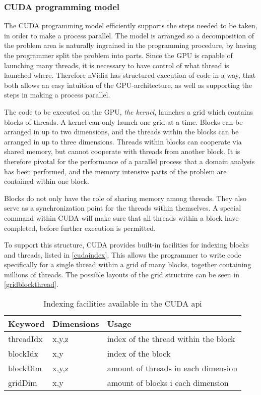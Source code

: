 \subsubsection{CUDA programming model}
The CUDA programming model efficiently supports the steps needed to be taken, in order to make a process parallel. The model is arranged so a decomposition of the problem area is naturally ingrained in the programming procedure, by having the programmer split the problem into parts. Since the GPU is capable of launching many threads, it is necessary to have control of what thread is launched where. Therefore nVidia has structured execution of code in a way, that both allows an easy intuition of the GPU-architecture, as well as supporting the steps in making a process parallel.

The code to be executed on the GPU, \emph{the kernel}, launches a grid which contains blocks of threads. A kernel can only launch one grid at a time. Blocks can be arranged in up to two dimensions, and the threads within the blocks can be arranged in up to three dimensions. Threads within blocks can cooperate via shared memory, but cannot cooperate with threads from another block. It is therefore pivotal for the performance of a parallel process that a domain analysis has been performed, and the memory intensive parts of the problem are contained within one block.

Blocks do not only have the role of sharing memory among threads. They also serve as a synchronization point for the threads within themselves. A special command within CUDA will make sure that all threads within a block have completed, before further execution is permitted.

To support this structure, CUDA provides built-in facilities for indexing blocks and threads, listed in \autoref{cudaindex}. This allows the programmer to write code specifically for a single thread within a grid of many blocks, together containing millions of threads. The possible layouts of the grid structure can be seen in \autoref{gridblockthread}.

\begin{table}[htb]
	\centering
	\begin{tabular}{lll}
		\toprule
		Keyword & Dimensions & Usage \\
		\midrule
		threadIdx & x,y,z & index of the thread within the block \\
		blockIdx & x,y & index of the block  \\
		blockDim & x,y,z & amount of threads in each dimension \\
		gridDim & x,y & amount of blocks i each dimension \\
		\bottomrule
	\end{tabular}
	\caption{Indexing facilities available in the CUDA api}
	\label{cudaindex}
\end{table}


